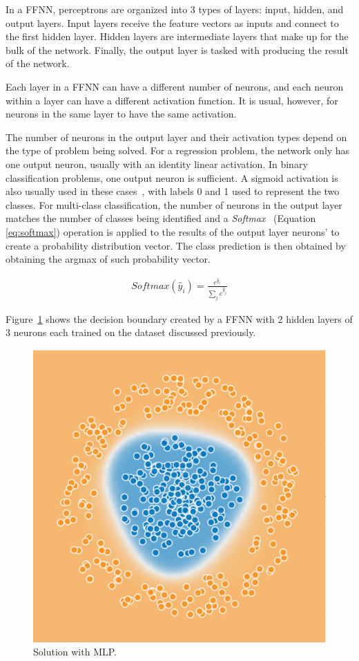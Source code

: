 In a FFNN, perceptrons are organized into 3 types of layers: input, hidden, and
output layers.  Input layers receive the feature vectors as inputs and connect
to the first hidden layer. Hidden layers are intermediate layers that make up
for the bulk of the network. Finally, the output layer is tasked with producing
the result of the network. 

Each layer in a FFNN can have a different number of neurons, and each neuron
within a layer can have a different activation function. It is usual, however,
for neurons in the same layer to have the same activation. 

The number of neurons in the output layer and their activation types depend on
the type of problem being solved. For a regression problem, the network only has
one output neuron, usually with an identity linear activation. In binary
classification problems, one output neuron is sufficient. A sigmoid activation
is also usually used in these cases~\cite{Cybenko1989ApproximationBS}, with
labels 0 and 1 used to represent the two classes. For multi-class
classification, the number of neurons in the output layer matches the number of
classes being identified and a \textit{Softmax}~\cite{pattern_recognition}
(Equation \ref{eq:softmax}) operation is applied to the results of the output
layer neurons' to create a probability distribution vector. The class prediction
is then obtained by obtaining the argmax of such probability vector.

\begin{align}
    \textit{Softmax}(\hat{y}_i) = \frac{e^{\hat{y}_i}}{\sum\limits_j e^{\hat{y}_j}}
    \label{eq:softmax}
\end{align}

Figure~\ref{fig:mlp_solved} shows the decision boundary created by a FFNN with 2
hidden layers of 3 neurons each trained on the dataset discussed previously.

\begin{figure}[!htbp]
    \centering
    \includegraphics[width=.35\textwidth]{Images/circles_solved.png}
    \caption{Solution with MLP.}
    \label{fig:mlp_solved}
\end{figure}

